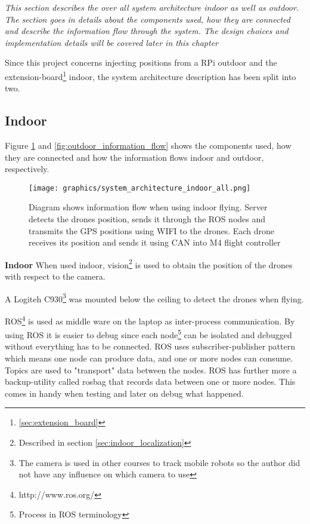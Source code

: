 \textit{This section describes the over all system architecture indoor as well as outdoor. The section goes in details about the components used, how they are connected and describe the information flow through the system. The design choices and implementation details will be covered later in this chapter}

Since this project concerns injecting positions from a RPi outdoor and the extension-board\footnote{\ref{sec:extension_board}} indoor, the system architecture description has been split into two.

\subsection{Indoor}
Figure \ref{fig:indoor_information_flow} and \ref{fig:outdoor_information_flow} shows the components used, how they are connected and how the information flows indoor and outdoor, respectively.
\begin{figure}[H]
    \center
    \texttt{[image: graphics/system\_architecture\_indoor\_all.png]}
    \caption{Diagram shows information flow when using indoor flying. Server detects the drones position, sends it through the ROS nodes and transmits the GPS positions using WIFI to the drones. Each drone receives its position and sends it using CAN into M4 flight controller}
    \label{fig:indoor_information_flow}
\end{figure}

\textbf{Indoor}
When used indoor, vision\footnote{ Described in section \ref{sec:indoor_localization}} is used to obtain the position of the drones with respect to the camera. 

A Logiteh C930\footnote{The camera is used in other courses to track mobile robots so the author did not have any influence on which camera to use} was mounted below the ceiling to detect the drones when flying.

ROS\footnote{http://www.ros.org/} is used as middle ware on the laptop as inter-process communication. By using ROS it is easier to debug since each node\footnote{Process in ROS terminology} can be isolated and debugged without everything has to be connected. ROS uses subscriber-publisher pattern which means one node can produce data, and one or more nodes can consume. Topics are used to "transport" data between the nodes. ROS has further more a backup-utility called rosbag that records data between one or more nodes. This comes in handy when testing and later on debug what happened. \\


